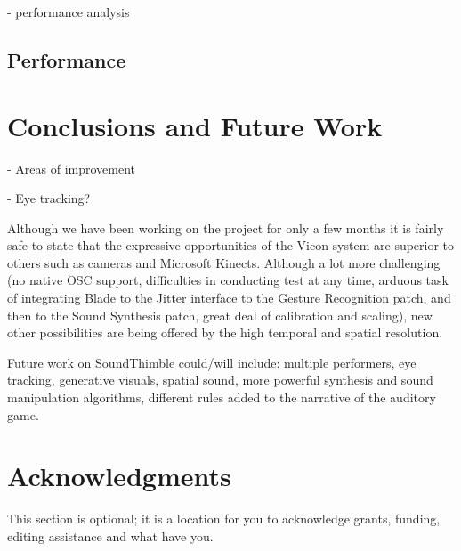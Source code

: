 \documentclass{nime-alternate}
\begin{document}
- performance analysis

\subsection{Performance}



\section{Conclusions and Future Work}
- Areas of improvement

- Eye tracking?

Although we have been working on the project for only a few months it is fairly safe to state that the expressive opportunities of the Vicon system are superior to others such as cameras and Microsoft Kinects. Although a lot more challenging (no native OSC support, difficulties in conducting test at any time, arduous task of integrating Blade to the Jitter interface to the Gesture Recognition patch, and then to the Sound Synthesis patch, great deal of calibration and scaling), new other possibilities are being offered by the high temporal and spatial resolution.

Future work on SoundThimble could/will include: multiple performers, eye tracking, generative visuals, spatial sound, more powerful synthesis and sound manipulation algorithms, different rules added to the narrative of the auditory game.


\section{Acknowledgments}
This section is optional; it is a location for you
to acknowledge grants, funding, editing assistance and
what have you. 

%

 

\end{document}

